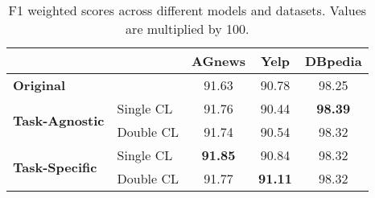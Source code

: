 \begin{table*}[h]
    \centering
    \begin{tabular}{|l|l|c|c|c|}
        \hline
        \multicolumn{2}{|c|}{} & \textbf{AGnews} & \textbf{Yelp} & \textbf{DBpedia} \\
        \hline
        \multicolumn{2}{|l|}{\textbf{Original}} & 91.63 & 90.78 & 98.25 \\
        \hline
        \multirow{2}{*}{\textbf{Task-Agnostic}} & Single CL & 91.76 & 90.44 & \textbf{98.39} \\
        & Double CL & 91.74 & 90.54 & 98.32 \\
        \hline
        \multirow{2}{*}{\textbf{Task-Specific}} & Single CL & \textbf{91.85} & 90.84 & 98.32 \\
        & Double CL & 91.77 & \textbf{91.11} & 98.32 \\
        \hline
    \end{tabular}
    \caption{F1 weighted scores across different models and datasets. Values are multiplied by 100.}
    \label{tab:f1_weighted_results}
\end{table*}